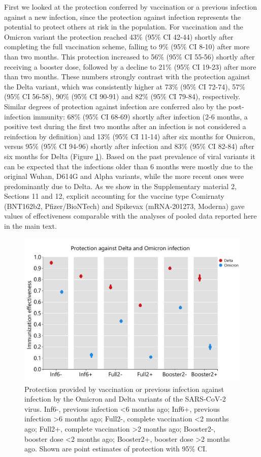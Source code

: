 \documentclass[9pt,twocolumn,twoside,lineno]{pnas-new}
\begin{document}
First we looked at the protection conferred by vaccination or a previous infection against a new infection, since the protection against infection represents the potential to protect others at risk in the population. For vaccination and the Omicron variant the protection reached 43\% (95\% CI 42-44) shortly after completing the full vaccination scheme, falling to 9\% (95\% CI 8-10) after more than two months. This protection increased to 56\% (95\% CI 55-56) shortly after receiving a booster dose, followed by a decline to 21\% (95\% CI 19-23) after more than two months. These numbers strongly contrast with the protection against the Delta variant, which was consistently higher at 73\% (95\% CI 72-74), 57\% (95\% CI 56-58), 90\% (95\% CI 90-91) and 82\% (95\% CI 79-84), respectively. Similar degrees of protection against infection are conferred also by the post-infection immunity: 68\% (95\% CI 68-69) shortly after infection (2-6 months, a positive test during the first two months after an infection is not considered a reinfection by definition) and 13\% (95\% CI 11-14) after six months for Omicron, versus 95\% (95\% CI 94-96) shortly after infection and 83\% (95\% CI 82-84) after six months for Delta (Figure \ref{figIalone}). Based on the past prevalence of viral variants it can be expected that the infections older than 6 months were mostly due to the original Wuhan, D614G and Alpha variants, while the more recent ones were predominantly due to Delta. As we show in the Supplementary material 2, Sections 11 and 12, explicit accounting for the vaccine type Comirnaty (BNT162b2, Pfizer/BioNTech) and Spikevax (mRNA-201273, Moderna) gave values of effectiveness comparable with the analyses of pooled data reported here in the main text.   

\begin{figure}[h]
\centering
\includegraphics[width=\linewidth]{fig2.pdf}
\caption{Protection provided by vaccination or previous infection against infection by the Omicron and Delta variants of the SARS-CoV-2 virus. Inf6-, previous infection <6 months ago; Inf6+, previous infection >6 months ago; Full2-, complete vaccination <2 months ago;  Full2+, complete vaccination >2 months ago; Booster2-, booster dose <2 months ago; Booster2+, booster dose >2 months ago. Shown are point estimates of protection with 95\% CI.}
\label{figIalone}
\end{figure}
\end{document}
